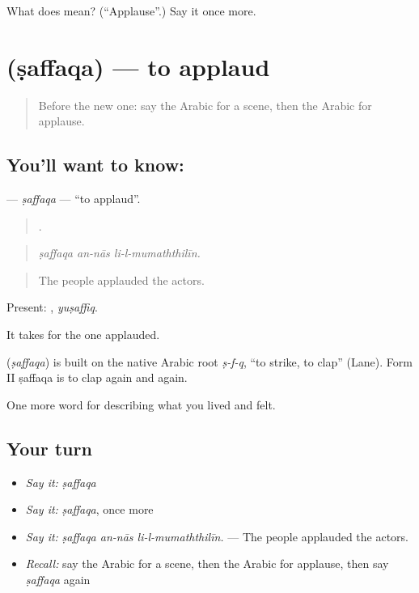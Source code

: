 \begin{tcolorbox}[breakable,colback=teal!4,colframe=teal!35!black,title={Before you move on}]
What does  mean? (\textquotedblleft{}Applause\textquotedblright{}.) Say it once more.
\end{tcolorbox}
\section[\texorpdfstring{\ar{صفق} (ṣaffaqa)}{صفق (ṣaffaqa)}]{ (ṣaffaqa) — to applaud}

\label{lesson:AR-C542-saffaqa}



\begin{quote}
Before the new one: say the Arabic for a scene, then the Arabic for applause.
\end{quote}

\subsection*{You'll want to know: }
\textbf{} — \emph{ṣaffaqa} — \textquotedblleft{}to applaud\textquotedblright{}.

\begin{quote}
  .
\end{quote}

\begin{quote}
\emph{ṣaffaqa an-nās li-l-mumaththilīn.}
\end{quote}

\begin{quote}
The people applauded the actors.
\end{quote}

Present: , \emph{yuṣaffiq}.

It takes  for the one applauded.

\begin{cousinweb}
\textbf{} (\emph{ṣaffaqa}) is built on the native Arabic root \emph{ṣ-f-q}, \textquotedblleft{}to strike, to clap\textquotedblright{} (Lane). Form II ṣaffaqa is to clap again and again.
\end{cousinweb}

\begin{grammarlens}[title={What you've built}]
One more word for describing what you lived and felt.
\end{grammarlens}

\subsection*{Your turn}
\begin{itemize}
\raggedright
  \item \emph{Say it:} \emph{ṣaffaqa}
  \item \emph{Say it:} \emph{ṣaffaqa}, once more
  \item \emph{Say it:} \emph{ṣaffaqa an-nās li-l-mumaththilīn.} — The people applauded the actors.
  \item \emph{Recall:} say the Arabic for a scene, then the Arabic for applause, then say \emph{ṣaffaqa} again
\end{itemize}

